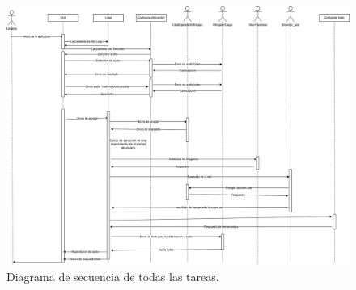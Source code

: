 \begin{figure}[h!]
  \includegraphics[scale=0.35]{img/Diagrama secuencia.drawio.png}
  \caption{Diagrama de secuencia de todas las tareas.}
  \label{fig:UML}
\end{figure}